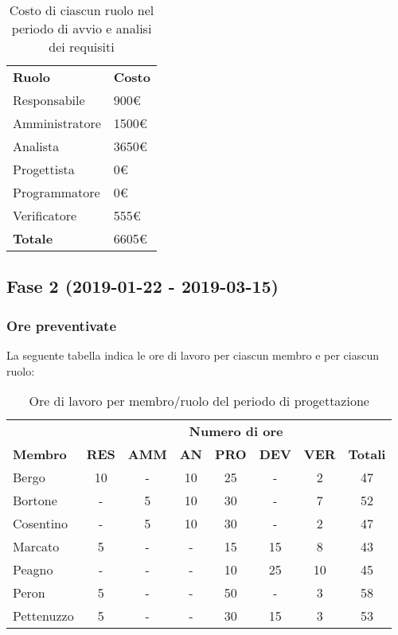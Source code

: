 		\begin{table}[h]
			\centering		
			\begin{tabular}{| l | l |}
				\rowcolor{LightBlue}
				\textbf{\color{white}Ruolo}
				& \textbf{\color{white}Costo}\\
			
				Responsabile 		& 900€\\
				Amministratore 	& 1500€\\
				Analista 				& 3650€\\			
				Progettista 			& 0€\\
				Programmatore 		& 0€\\
				Verificatore 		& 555€\\ \hline
				\textbf{Totale} 	& 6605€\\ \hline
			\end{tabular}
			\caption{Costo di ciascun ruolo nel periodo di avvio e analisi dei requisiti}
		\end{table}

\newpage
\subsection{Fase 2 (2019-01-22 - 2019-03-15)}
	\subsubsection{Ore preventivate}
		La seguente tabella indica le ore di lavoro per ciascun membro e per ciascun ruolo:
		\begin{table}[h]
			\centering
			\begin{tabular}{| l | c c c c c c | c |}
				\rowcolor{LightBlue}
				& \multicolumn{7}{c}{\textbf{\color{white}Numero di ore}}	\\
	
				\rowcolor{LightBlue}
				\textbf{\color{white}Membro}
				& \textbf{\color{white}RES}
				& \textbf{\color{white}AMM}
				& \textbf{\color{white}AN}
				& \textbf{\color{white}PRO}
				& \textbf{\color{white}DEV}
				& \textbf{\color{white}VER}
				& \textbf{\color{white}Totali}\\

				Bergo      & 10 & - & 10 & 25 & - & 2 	& 47 \\
				Bortone    & - & 5 & 10 & 30 & - & 7 & 52 \\
				Cosentino  & - & 5 & 10 & 30 & - & 2 & 47 \\
				Marcato    & 5 & - & - & 15 & 15 & 8 & 43 \\
				Peagno     & - & - & - & 10 & 25 & 10 & 45 \\
				Peron      & 5 & - & - & 50 & - & 3 & 58 \\
				Pettenuzzo & 5 & - & - & 30 & 15 & 3 & 53 \\ \hline
			\end{tabular}
			\caption{Ore di lavoro per membro/ruolo del periodo di progettazione}
		\end{table}		
		
